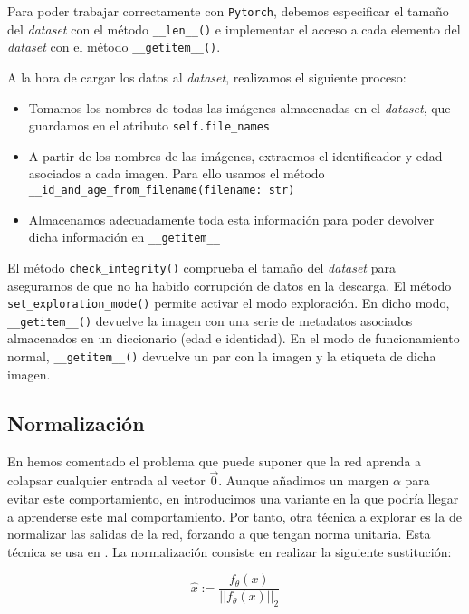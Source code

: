 Para poder trabajar correctamente con \lstinline{Pytorch}, debemos especificar el tamaño del \textit{dataset} con el método \lstinline{__len__()} e implementar el acceso a cada elemento del \textit{dataset} con el método \lstinline{__getitem__()}.

A la hora de cargar los datos al \textit{dataset}, realizamos el siguiente proceso:

\begin{itemize}
    \item Tomamos los nombres de todas las imágenes almacenadas en el \textit{dataset}, que guardamos en el atributo \lstinline{self.file_names}
    \item A partir de los nombres de las imágenes, extraemos el identificador y edad asociados a cada imagen. Para ello usamos el método \lstinline{__id_and_age_from_filename(filename: str)}
    \item Almacenamos adecuadamente toda esta información para poder devolver dicha información en \lstinline{__getitem__}
\end{itemize}

El método \lstinline{check_integrity()} comprueba el tamaño del \textit{dataset} para asegurarnos de que no ha habido corrupción de datos en la descarga. El método \lstinline{set_exploration_mode()} permite activar el modo exploración. En dicho modo, \lstinline{__getitem__()} devuelve la imagen con una serie de metadatos asociados almacenados en un diccionario (edad e identidad). En el modo de funcionamiento normal, \lstinline{__getitem__()} devuelve un par con la imagen y la etiqueta de dicha imagen.

\subsection{Normalización} \label{isubs:normalization_impl}

En  hemos comentado el problema que puede suponer que la red aprenda a colapsar cualquier entrada al vector $\vec{0}$. Aunque añadimos un margen $\alpha$ para evitar este comportamiento, en  introducimos una variante en la que podría llegar a aprenderse este mal comportamiento. Por tanto, otra técnica a explorar es la de normalizar las salidas de la red, forzando a que tengan norma unitaria. Esta técnica se usa en \cite{informatica:facenet}. La normalización consiste en realizar la siguiente sustitución:

\begin{equation} \label{ieq:normalizacion}
    \hat{x} := \frac{f_{\theta}(x)}{||f_{\theta}(x)||_2}
\end{equation}

